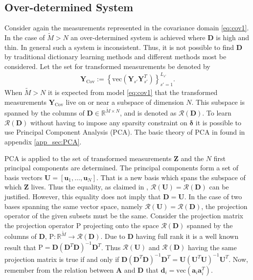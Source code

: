 \subsection{Over-determined System}\label{sec:over_det}
Consider again the measurements represented in the covariance domain \eqref{eq:cov1}.
In the case of $\widetilde{M} > N$ an over-determined system is achieved where $\mathbf{D}$ is high and thin. 
In general such a system is inconsistent. 
Thus, it is not possible to find $\mathbf{D}$ by traditional dictionary learning methods and different methods most be considered.
Let the set for transformed measurements be denoted by 
\begin{align*}
\mathbf{Y}_{\text{Cov}} := \left\{\text{vec}\left( \mathbf{Y}_{s'} \mathbf{Y}_{s'}^T \right) \right\}_{s' = 1}^{L_{s'}}.
\end{align*}
When $ \widetilde{M} > N $ it is expected from model \eqref{eq:cov1} that the transformed measurements $\mathbf{Y}_{\text{Cov}}$ live on or near a subspace of dimension $N$. 
This subspace is spanned by the columns of $\mathbf{D} \in \mathbb{R}^{\widetilde{M} \times N}$, and is denoted as $\mathcal{R}(\mathbf{D})$. 
To learn $\mathcal{R}(\mathbf{D})$ without having to impose any sparsity constraint on $\boldsymbol{\delta}$ it is possible to use Principal Component Analysis (PCA). The basic theory of PCA in found in appendix \ref{app_sec:PCA}. 

PCA is applied to the set of transformed measurements $\mathbf{Z}$ and the $N$ first principal components are determined. 
The principal components form a set of basis vectors $\mathbf{U} = [\mathbf{u}_1, \dots, \mathbf{u}_N]$. 
That is a new basis which spans the subspace of which $\mathbf{Z}$ lives. 
Thus the equality, as claimed in \cite{Balkan2015}, $\mathcal{R}(\mathbf{U}) = \mathcal{R}(\mathbf{D})$ can be justified.  
However, this equality does not imply that $\mathbf{D} = \mathbf{U}$. 
In the case of two bases spanning the same vector space, namely $\mathcal{R}(\mathbf{U}) = \mathcal{R}(\mathbf{D})$, the projection operator of the given subsets must be the same. 
Consider the projection matrix the projection operator $\text{P}$ projecting onto the space $\mathcal{R}(\mathbf{D})$ spanned by the columns of $\mathbf{D}$, $\text{P}:\mathbb{R}^{\widetilde{M}}\rightarrow \mathcal{R}(\mathbf{D})$. 
Due to $\mathbf{D}$ having full rank it is a well known result that $\text{P} = \mathbf{D}(\mathbf{D}^T \mathbf{D})^{-1} \mathbf{D}^T$. 
Thus $\mathcal{R}(\mathbf{U})$ and $\mathcal{R}(\mathbf{D})$ having the same projection matrix is true if and only if $\mathbf{D} (\mathbf{D}^T\mathbf{D})^{-1} \mathbf{D}^T = \mathbf{U}(\mathbf{U}^T \mathbf{U})^{-1} \mathbf{U}^T$. 
Now, remember from the relation between $\mathbf{A}$ and $\mathbf{D}$ that $\mathbf{d}_i = \text{vec}(\mathbf{a}_i \mathbf{a}_i^T)$. 


